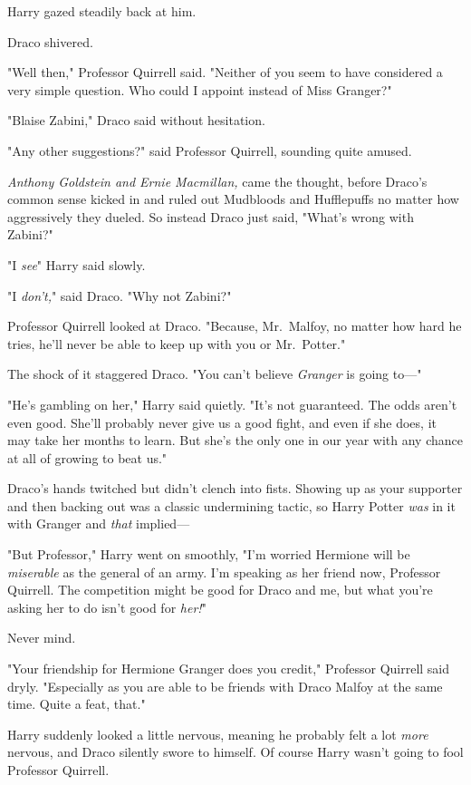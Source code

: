 Harry gazed steadily back at him.

Draco shivered.

"Well then," Professor Quirrell said. "Neither of you seem to have considered a
very simple question. Who could I appoint instead of Miss Granger?"

"Blaise Zabini," Draco said without hesitation.

"Any other suggestions?" said Professor Quirrell, sounding quite amused.

\emph{Anthony Goldstein and Ernie Macmillan,} came the thought, before Draco's
common sense kicked in and ruled out Mudbloods and Hufflepuffs no matter how
aggressively they dueled. So instead Draco just said, "What's wrong with
Zabini?"

"I \emph{see}{\el}" Harry said slowly.

"I \emph{don't,}" said Draco. "Why not Zabini?"

Professor Quirrell looked at Draco. "Because, Mr.~Malfoy, no matter how hard he
tries, he'll never be able to keep up with you or Mr.~Potter."

The shock of it staggered Draco. "You can't believe \emph{Granger} is going
to\mbox{---}"

"He's gambling on her," Harry said quietly. "It's not guaranteed. The odds
aren't even good. She'll probably never give us a good fight, and even if she
does, it may take her months to learn. But she's the only one in our year with
any chance at all of growing to beat us."

Draco's hands twitched but didn't clench into fists. Showing up as your
supporter and then backing out was a classic undermining tactic, so Harry
Potter \emph{was} in it with Granger and \emph{that} implied---

"But Professor," Harry went on smoothly, "I'm worried Hermione will be
\emph{miserable} as the general of an army. I'm speaking as her friend now,
Professor Quirrell. The competition might be good for Draco and me, but what
you're asking her to do isn't good for \emph{her!}"

Never mind.

"Your friendship for Hermione Granger does you credit," Professor Quirrell said
dryly. "Especially as you are able to be friends with Draco Malfoy at the same
time. Quite a feat, that."

Harry suddenly looked a little nervous, meaning he probably felt a lot
\emph{more} nervous, and Draco silently swore to himself. Of course Harry
wasn't going to fool Professor Quirrell.

